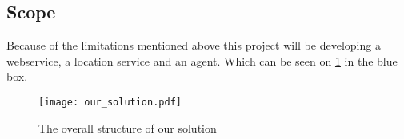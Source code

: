 \subsection{Scope}
Because of the limitations mentioned above this project will be developing a webservice, a location service and an agent.
Which can be seen on \cref{fig:solution_structure} in the blue box.
 
 \begin{figure}[H]
\texttt{[image: our\_solution.pdf]}
\caption{The overall structure of our solution}
\label{fig:solution_structure}
\end{figure}